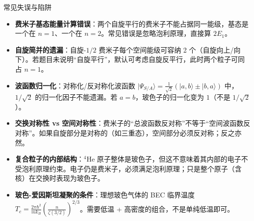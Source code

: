 \begin{errorbox}{常见失误与陷阱}
\begin{itemize}
    \item \textbf{费米子基态能量计算错误}：两个自旋平行的费米子不能占据同一能级，基态是一个在 $n=1$、一个在 $n=2$。常见错误是忽略泡利原理，直接算 $2E_1$。
    \item \textbf{自旋简并的遗漏}：自旋-$1/2$ 费米子每个空间能级可容纳 2 个（自旋向上/向下）。若题目未说明``自旋平行''，默认可考虑自旋反平行，此时两个粒子可同占 $n=1$。
    \item \textbf{波函数归一化}：对称化/反对称化波函数 $|\Psi_{S/A}\rangle=\frac{1}{\sqrt{2}}(|a,b\rangle\pm|b,a\rangle)$ 中，$1/\sqrt{2}$ 的归一化因子不能遗漏。若 $a=b$，玻色子的归一化变为 $1$（不是 $1/\sqrt{2}$）。
    \item \textbf{交换对称性 vs 空间对称性}：费米子的``总波函数反对称''不等于``空间波函数反对称''。如果自旋部分是对称的（如三重态），空间部分必须反对称；反之亦然。
    \item \textbf{复合粒子的内部结构}：$^4$He 原子整体是玻色子，但这不意味着其内部的电子不受泡利原理约束。电子仍是费米子，必须满足泡利原理；只是整个原子（含核）在交换时表现为玻色子。
    \item \textbf{玻色-爱因斯坦凝聚的条件}：理想玻色气体的 BEC 临界温度 $T_c=\frac{2\pi\hbar^2}{mk_B}\left(\frac{n}{\zeta(3/2)}\right)^{2/3}$。需要低温 + 高密度的组合，不是单纯低温即可。
\end{itemize}
\end{errorbox}

